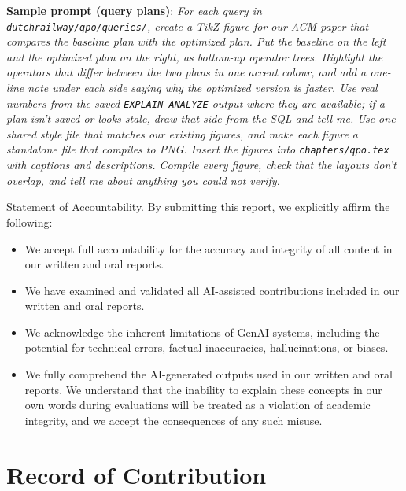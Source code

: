 \documentclass[sigconf, pbalance]{acmart}
\renewcommand{\_}{\oldunderscore\allowbreak}}
\begin{document}
\begin{itemize}
  \textbf{Sample prompt (query plans)}: \emph{For each query in \texttt{dutch\_railway/qpo/queries/}, create a TikZ figure for our ACM paper that compares the baseline plan with the optimized plan. Put the baseline on the left and the optimized plan on the right, as bottom-up operator trees. Highlight the operators that differ between the two plans in one accent colour, and add a one-line note under each side saying why the optimized version is faster. Use real numbers from the saved \texttt{EXPLAIN ANALYZE} output where they are available; if a plan isn't saved or looks stale, draw that side from the SQL and tell me. Use one shared style file that matches our existing figures, and make each figure a standalone file that compiles to PNG. Insert the figures into \texttt{chapters/qpo.tex} with captions and descriptions. Compile every figure, check that the layouts don't overlap, and tell me about anything you could not verify.}
\end{itemize}

Statement of Accountability. By submitting this report, we explicitly affirm the following:

\begin{itemize}
  \item We accept full accountability for the accuracy and integrity of all content in our written and oral reports. 
  \item We have examined and validated all AI-assisted contributions included in our written and oral reports.
  \item We acknowledge the inherent limitations of GenAI systems, including the potential for technical errors, factual inaccuracies, hallucinations, or biases.
  \item We fully comprehend the AI-generated outputs used in our written and oral reports. We understand that the inability to explain these concepts in our own words during evaluations will be treated as a violation of academic integrity, and we accept the consequences of any such misuse.
\end{itemize}

\section*{Record of Contribution}
\end{document}
